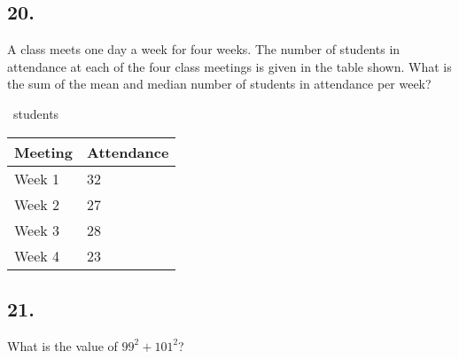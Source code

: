 \documentclass[12pt]{article}
\begin{document}
\subsection*{20.}
A class meets one day a week for four weeks. The number of students in attendance at each of the four class meetings is given in the table shown. What is the sum of the mean and median number of students in attendance per week? 

\nopagebreak

\fbox{\phantom{ANSWER}}~students

\begin{center}
\renewcommand{\arraystretch}{1.5}
\begin{tabular}{@{}L{3cm}C{4cm}@{}} 
\toprule
    Meeting & Attendance \\
\midrule
    Week 1 & 32 \\
    Week 2 & 27 \\
    Week 3 & 28 \\
    Week 4 & 23 \\
\bottomrule
\end{tabular}
\end{center}

\begin{answer}
%
\end{answer}


\subsection*{21.}
What is the value of $99^2+101^2$?
\end{document}
